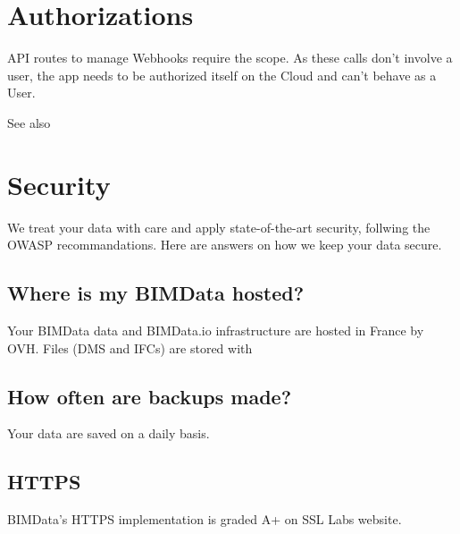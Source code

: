 \documentclass[a4paper,12pt,english]{sphinxmanual}
\begin{document}
\section{Authorizations}
\label{\detokenize{guide/webhooks:authorizations}}
API routes to manage Webhooks require the  scope.
As these calls don’t involve a user, the app needs to be authorized itself
on the Cloud and can’t behave as a User.




See also {\hyperref[\detokenize{concepts/ifc::doc}]{}}




\section{Security}
\label{\detokenize{guide/security:security}}\label{\detokenize{guide/security::doc}}
We treat your data with care and apply state-of-the-art security, follwing the OWASP recommandations.
Here are answers on how we keep your data secure.


\subsection{Where is my BIMData hosted?}
\label{\detokenize{guide/security:where-is-my-bimdata-hosted}}
Your BIMData data and BIMData.io infrastructure are hosted in France by OVH.
Files (DMS and IFCs) are stored with %
\begin{footnote}[8]\sphinxAtStartFootnote
{}
%
\end{footnote}


\subsection{How often are backups made?}
\label{\detokenize{guide/security:how-often-are-backups-made}}
Your data are saved on a daily basis.


\subsection{HTTPS}
\label{\detokenize{guide/security:https}}
BIMData’s HTTPS implementation is graded A+ on SSL Labs website.

\end{document}
